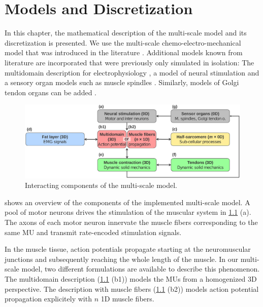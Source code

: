 \chapter{Models and Discretization}

In this chapter, the mathematical description of the multi-scale model and its discretization is presented. 
We use the multi-scale chemo-electro-mechanical model that was introduced in the literature \cite{Roehrle2012,Heidlauf2013,Heidlauf2015Diss,Mordhorst2015}. Additional models known from literature are incorporated that  were previously only simulated in isolation: The multidomain description for electrophysiology \cite{Klotz2020}, a model of neural stimulation \cite{Cisi2008} and a sensory organ models such as muscle spindles \cite{Mileusnic2006Spindle}. Similarly, models of Golgi tendon organs can be added \cite{Mileusnic2006Golgi}.

\begin{figure}[H]%
  \centering%
  \includegraphics[width=\textwidth]{images/theory/model_schematic.pdf}%
  \caption{Interacting components of the multi-scale model.}%
  \label{fig:multi-scale-model}%
\end{figure}

 shows an overview of the components of the implemented multi-scale model.
A pool of motor neurons drives the stimulation of the muscular system in \cref{fig:multi-scale-model} (a). 
The axons of each motor neuron innervate the muscle fibers corresponding to the same MU and transmit rate-encoded stimulation signals.

In the muscle tissue, action potentials propagate starting at the neuromuscular junctions and subsequently reaching the whole length of the muscle.
In our multi-scale model, two different formulations are available to describe this phenomenon. The multidomain description (\cref{fig:multi-scale-model} (b1)) models the MUs from a  homogenized 3D perspective. The description with muscle fibers (\cref{fig:multi-scale-model} (b2)) models action potential propagation explicitely with $n$ 1D muscle fibers. 

